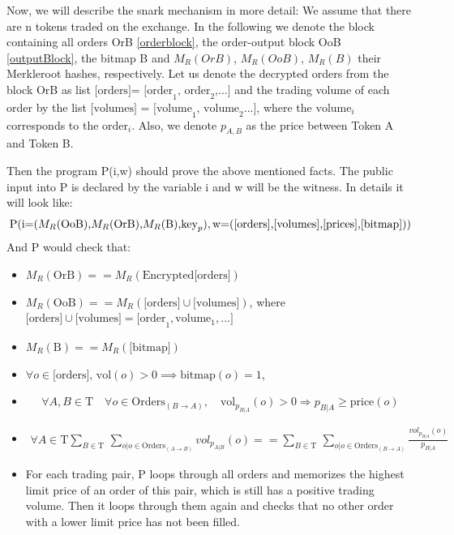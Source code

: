 \documentclass[11pt,parskip=full]{scrartcl}%
\newcommand{\Tau}{\mathrm{T}}
\begin{document}
Now, we will describe the snark mechanism in more detail: We assume that there are n tokens traded on the exchange. In the following we denote the block containing all orders OrB \ref{orderblock}, the order-output block OoB \ref{outputBlock}, the bitmap B and $M_R(OrB)$, $M_R(OoB)$, $M_R(B)$ their Merkleroot hashes, respectively. Let us denote the decrypted orders from the block OrB as list $\text{[orders]= [order}_1\text{, order}_2\text{,...]}$ and the trading volume of each order by the list $\text{[volumes] = [volume}_1\text{, volume}_2\text{...]}$, where the $\text{volume}_i$ corresponds to the $\text{order}_i$. Also, we denote  $p_{A,B}$ as the price between Token A and Token B.

Then the program P(i,w) should prove the above mentioned facts. The public input into P is declared by the variable i and w will be the witness. In details it will look like:
\begin{equation}
\text{P(i=(}M_R\text{(OoB),}M_R\text{(OrB),}M_R\text{(B),} \text{key}_p),\\
\text{w=([orders],[volumes],[prices],[bitmap]))} 
\end{equation}
And P would check that:
\begin{itemize}
\item  $M_R(\text{OrB}) == M_R(\text{Encrypted[orders]})$
\item  $M_R(\text{OoB}) == M_R(\text{[orders]} \cup \text{[volumes]})$,\newline
where $\text{[orders]} \cup \text{[volumes]} = \text{[order}_1, \text{volume}_1, ...] $
\item $ M_R(\text{B}) == M_R(\text{[bitmap]})$
\item $\forall o \in \text{[orders], vol}(o)>0 \implies \text{bitmap}(o) = 1 $, 

\item 
\begin{equation} \forall A,B \in \Tau  \quad \forall o \in \text{Orders}_{(B\rightarrow A)}, \quad \text{vol}_{p_{B|A}}(o)>0 \Rightarrow p_{B|A}\geq \text{price}(o)
\end{equation}
\item 
\begin{equation}
\begin{split}
\forall A \in \Tau \sum_{B\in \Tau} \,
\sum_{o| o\in \text{Orders}_{(A\rightarrow B)}} vol_{p_{A|B}}(o) == \sum_{B\in \Tau} \, \sum_{o| o\in \text{Orders}_{(B\rightarrow A)}} \frac{vol_{p_{B|A}}(o)}{p_{B|A}}
\end{split}
\end{equation}

\item For each trading pair, P loops through all orders and memorizes the highest limit price of an order of this pair, which is still has a positive trading volume. Then it loops through them again and checks that no other order with a lower limit price has not been filled.
\end{itemize}
\end{document}
